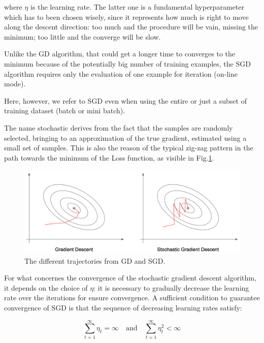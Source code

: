 		where $\eta$ is the learning rate. The latter one is a fundamental hyperparameter which has to been chosen wisely, since it represents how much is right to move along the descent direction: too much and the procedure will be vain, missing the minimum; too little and the converge will be slow.

		Unlike the GD algorithm, that could get a longer time to converges to the minimum because of the potentially big number of training examples, the SGD algorithm requires only the evaluation of one example for iteration (on-line mode).

		Here, however, we refer to SGD even when using the entire or just a subset of training dataset (batch or mini batch).

		The name stochastic derives from the fact that the samples are randomly selected, bringing to an approximation of the true gradient, estimated using a small set of samples. This is also the reason of the typical zig-zag pattern in the path towards the minimum of the Loss function, as visible in Fig.\ref{fig:gradient}.
		\begin{figure}
			\centering
		    \includegraphics[width=.8\linewidth, scale=0.7]{img/figures/gradient.png}
			\caption{The different trajectories from GD and SGD.}
			\label{fig:gradient}
		\end{figure}

		For what concernes the convergence of the stochastic gradient descent algorithm, it depends on the choice of $\eta$: it is necessary to gradually decrease the learning rate over the iterations for ensure convergence.
		A sufficient condition to guarantee convergence of SGD is that the sequence of decreasing learning rates satisfy:

		\begin{equation}
			\label{delta}
			\sum_{t=1}^\infty \eta_t = \infty \text{  } \text{ and }\text{  } \sum_{t=1}^\infty \eta_t^2 < \infty
		\end{equation}

